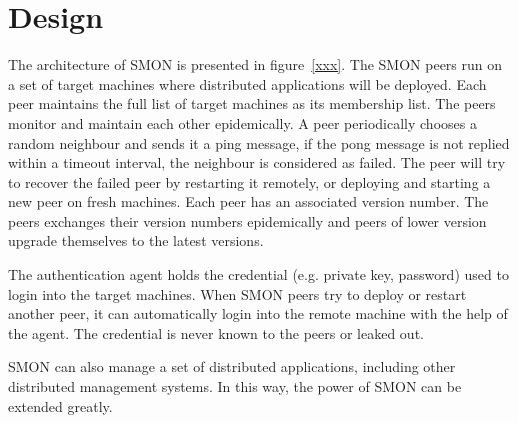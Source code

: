\section{Design}
\label{sec:design}

The architecture of SMON is presented in figure~\ref{xxx}.
The SMON peers run on a set of target machines where
distributed applications will be deployed. Each peer
maintains the full list of target machines as its membership
list. The peers monitor and maintain each other
epidemically. A peer periodically chooses a random neighbour
and sends it a ping message, if the pong message is not
replied within a timeout interval, the neighbour is
considered as failed. The peer will try to recover the
failed peer by restarting it remotely, or deploying and
starting a new peer on fresh machines. Each peer has an
associated version number. The peers exchanges their version
numbers epidemically and peers of lower version upgrade
themselves to the latest versions.

The authentication agent holds the credential (e.g. private
key, password) used to login into the target machines. When
SMON peers try to deploy or restart another peer, it can
automatically login into the remote machine with the help of
the agent. The credential is never known to the peers or
leaked out.

SMON can also manage a set of distributed applications,
including other distributed management systems. In this way,
the power of SMON can be extended greatly.

